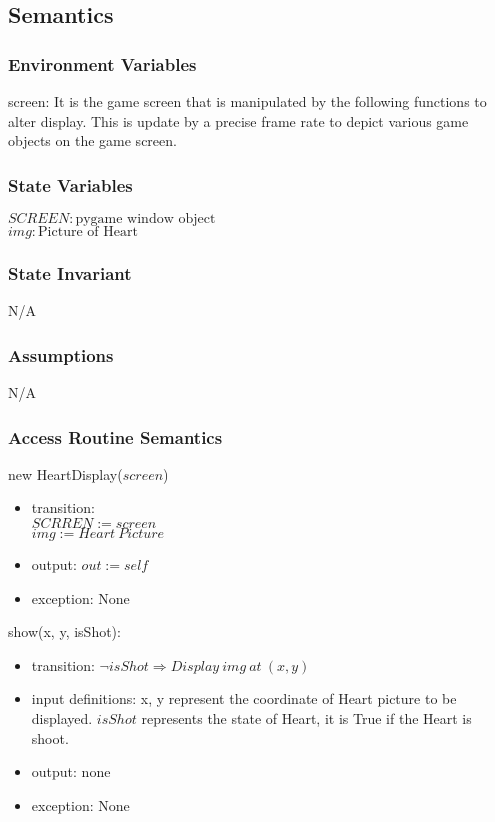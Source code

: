 \documentclass[12pt]{article}
\begin{document}
\subsection*{Semantics}
\subsubsection*{Environment Variables}
screen: It is the game screen that is manipulated by the following functions to alter display. This is update by a precise frame rate to depict various game objects on the game screen.
\subsubsection*{State Variables}
$SCREEN : \text{pygame window object}$\\
$img : \text{Picture of Heart}$
\subsubsection*{State Invariant}
N/A
\subsubsection*{Assumptions}
N/A
\subsubsection*{Access Routine Semantics}

new HeartDisplay($screen$)
\begin{itemize}
    \item transition:\\
    $SCRREN := screen$\\
    $img := Heart\ Picture$
    \item output: $out := self$
    \item exception: None
\end{itemize}

\noindent show(x, y, isShot):
\begin{itemize}
    \item transition: $\lnot isShot \Rightarrow Display\ img\ at\ (x, y)$
    \item input definitions: x, y represent the coordinate of Heart
    picture to be displayed. $isShot$ represents the state of Heart, it is True if the Heart is shoot.
    \item output: none
    \item exception: None
\end{itemize}
\newpage
\end{document}
